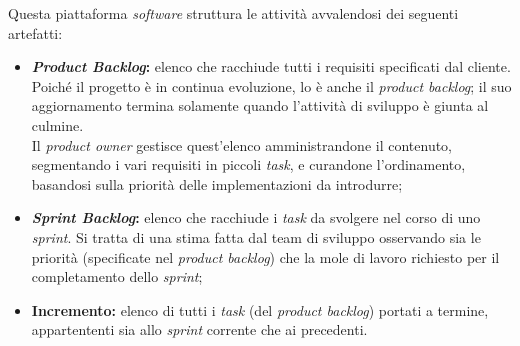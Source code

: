 Questa piattaforma \textit{software} struttura le attività avvalendosi dei seguenti artefatti:
\begin{itemize}
  \item \textbf{\textit{Product Backlog}:} elenco che racchiude tutti i requisiti specificati dal cliente. Poiché il progetto è in continua evoluzione, lo è anche il \textit{product backlog}; il suo aggiornamento termina solamente quando l'attività di sviluppo è giunta al culmine.\\
  Il \textit{product owner} gestisce quest'elenco amministrandone il contenuto, segmentando i vari requisiti in piccoli \textit{task}, e curandone l’ordinamento, basandosi sulla priorità delle implementazioni da introdurre;
  
  \item \textbf{\textit{Sprint Backlog}:} elenco che racchiude i \textit{task} da svolgere nel corso di uno \textit{sprint}. Si tratta di una stima fatta dal team di sviluppo osservando sia le priorità (specificate nel \textit{product backlog}) che la mole di lavoro richiesto per il completamento dello \textit{sprint};
  
  \item \textbf{Incremento:} elenco di tutti i \textit{task} (del \textit{product backlog}) portati a termine, appartententi sia allo \textit{sprint} corrente che ai precedenti. 
\end{itemize} 

